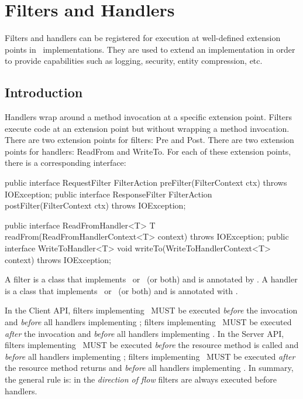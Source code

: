 \chapter{Filters and Handlers}
\label{filters_and_handlers}

Filters and handlers can be registered for execution at well-defined extension points in \jaxrs\ implementations. They are used to extend an implementation in order to provide capabilities such as logging, security, entity compression, etc. 

\section{Introduction}
\label{introduction_filters}
Handlers wrap around a method invocation at a specific extension point. Filters execute code at an extension point but without wrapping a method invocation. There are two extension points for filters: Pre and Post. There are two extension points for handlers: ReadFrom and WriteTo.  For each of these extension points, there is a corresponding interface:

\begin{listing}{1}
public interface RequestFilter {
    FilterAction preFilter(FilterContext ctx) throws IOException;
}
public interface ResponseFilter {
    FilterAction postFilter(FilterContext ctx) throws IOException;
}
\end{listing}

\begin{listing}{1}
public interface ReadFromHandler<T> {
    T readFrom(ReadFromHandlerContext<T> context) throws IOException;
}
public interface WriteToHandler<T> {
    void writeTo(WriteToHandlerContext<T> context) throws IOException;
}
\end{listing}

A filter is a class that implements \RequestFilter\ or \ResponseFilter\ (or both) and is annotated by \Provider. A handler is a class that implements \ReadFromHandler\ or \WriteToHandler\ (or both) and is annotated with \Provider. 

In the Client API, filters implementing \RequestFilter\ MUST be executed \emph{before} the invocation and \emph{before} all handlers implementing \WriteToHandler; filters implementing \ResponseFilter\ MUST be executed \emph{after} the invocation and \emph{before} all handlers implementing \ReadFromHandler. 
In the Server API, filters implementing \RequestFilter\ MUST be executed \emph{before} the resource method is called and \emph{before} all handlers implementing \ReadFromHandler; filters implementing \ResponseFilter\ MUST be executed \emph{after} the resource method returns and \emph{before} all handlers implementing \WriteToHandler. In summary, the general rule is: in the {\em direction of flow} filters are always executed before handlers.

